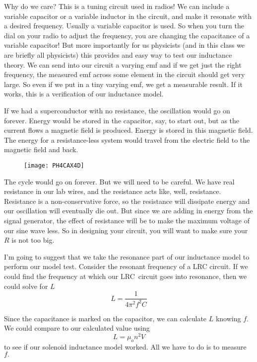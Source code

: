 Why do we care? This is a tuning circuit used in radios! We can include a variable capacitor or a variable inductor in the circuit, and make it resonate with a desired frequency. Usually a variable capacitor is used. So when you turn the dial on your radio to adjust the frequency, you are changing the capacitance of a variable capacitor! But more importantly for us physicists (and in this class we are briefly all physicists) this provides and easy way to test our inductance theory. We can send into our circuit a varying emf and if we get just the right frequency, the measured emf across some element in the circuit should get very large.  So even if we put in a tiny varying emf, we get a measurable result.  If it works, this is a verification of our inductance model.

If we had a superconductor with no resistance, the oscillation would go on forever. Energy would be stored in the capacitor, say, to start out, but as the current flows a magnetic field is produced. Energy is stored in this magnetic field. The energy for a resistance-less system would travel from the electric field to the magnetic field and back.
\begin{figure}[h!]
	\centering
	\texttt{[image: PH4CAX4D]}
\end{figure}
The cycle would go on forever. But we will need to be careful. We have real resistance in our lab wires, and the resistance acts like, well, resistance. Resistance is a non-conservative force, so the resistance will dissipate energy and our oscillation will eventually die out. But since we are adding in energy from the signal generator, the effect of resistance will be to make the maximum voltage of our sine wave less. So in designing your circuit, you will want to make sure your $R$ is not too big.

I'm going to suggest that we take the resonance part of our inductance model to perform our model test. Consider the resonant frequency of a LRC circuit. If we could find the frequency at which our LRC\ circuit goes into resonance, then we could solve for $L$%
\begin{equation*}
	L=\frac{1}{4\pi ^{2}f^{2}C}
\end{equation*}

Since the capacitance is marked on the capacitor, we can calculate $L$ knowing $f.$ We could compare to our calculated value using 
\begin{equation*}
	L=\mu _{o}n^{2}V
\end{equation*}
to see if our solenoid inductance model worked. All we have to do is to measure $f.$


